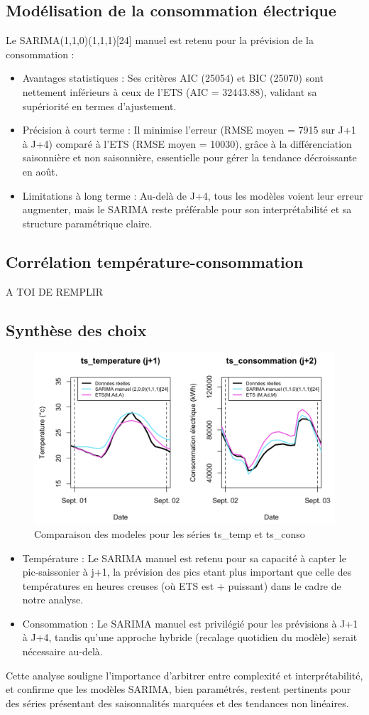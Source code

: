 \documentclass{article}
\theoremstyle{definition}
\theoremstyle{remark}
\begin{document}
\subsection*{Modélisation de la consommation électrique}
Le SARIMA(1,1,0)(1,1,1)[24] manuel est retenu pour la prévision de la consommation :
\begin{itemize}
    \item Avantages statistiques : Ses critères AIC (25054) et BIC (25070) sont nettement inférieurs à ceux de l'ETS (AIC = 32443.88), validant sa supériorité en termes d'ajustement.
    \item Précision à court terme : Il minimise l'erreur (RMSE moyen = 7915 sur J+1 à J+4) comparé à l'ETS (RMSE moyen = 10030), grâce à la différenciation saisonnière et non saisonnière, essentielle pour gérer la tendance décroissante en août.
    \item Limitations à long terme : Au-delà de J+4, tous les modèles voient leur erreur augmenter, mais le SARIMA reste préférable pour son interprétabilité et sa structure paramétrique claire.
\end{itemize}
\subsection*{Corrélation température-consommation}
A TOI DE REMPLIR
\subsection*{Synthèse des choix}
\FloatBarrier
\begin{figure}[!h]
    \centering
    \includegraphics[width=0.8\linewidth]{concl.png}
    \caption{\centering Comparaison des modeles pour les séries ts\_temp et ts\_conso}
    \label{fig:enter-label}
\end{figure}

\begin{itemize}
    \item Température : Le SARIMA manuel est retenu pour sa capacité à capter le pic-saissonier à j+1, la prévision des pics etant plus important que celle des températures en heures creuses (où ETS est + puissant) dans le cadre de notre analyse.
    \item Consommation : Le SARIMA manuel est privilégié pour les prévisions à J+1 à J+4, tandis qu'une approche hybride (recalage quotidien du modèle) serait nécessaire au-delà.
\end{itemize}


Cette analyse souligne l'importance d'arbitrer entre complexité et interprétabilité, et confirme que les modèles SARIMA, bien paramétrés, restent pertinents pour des séries présentant des saisonnalités marquées et des tendances non linéaires.
\end{document}
